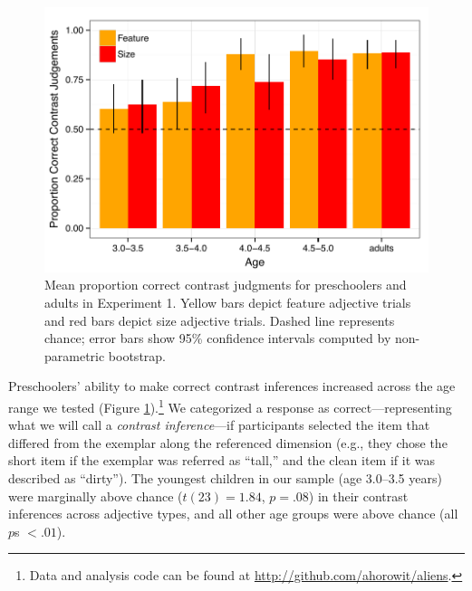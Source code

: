 \documentclass[man]{apa2}
\begin{document}
\begin{figure}[t] 
  \begin{center} 
    \includegraphics[width=5in]{figures/expt1_mod.pdf} 
    \caption{\label{fig:expt1_kidsAdults} Mean proportion correct contrast judgments for preschoolers and adults in Experiment 1. Yellow bars depict feature adjective trials and red bars depict size adjective trials. Dashed line represents chance; error bars show 95\% confidence intervals computed by non-parametric bootstrap.}
  \end{center} 
  \vspace{-10ex} 
\end{figure}	

Preschoolers' ability to make correct contrast inferences increased across the age range we tested (Figure \ref{fig:expt1_kidsAdults}).\footnote{Data and analysis code can be found at \url{http://github.com/ahorowit/aliens}.} We categorized a response as correct---representing what we will call a \emph{contrast inference}---if participants selected the item that differed from the exemplar along the referenced dimension (e.g., they chose the short item if the exemplar was referred as ``tall,'' and the clean item if it was described as ``dirty'').  The youngest children in our sample (age 3.0--3.5 years) were marginally above chance ($t(23) = 1.84$, $p = .08$) in their contrast inferences across adjective types, and all other age groups were above chance (all $p$s $< .01$).


\end{document}
